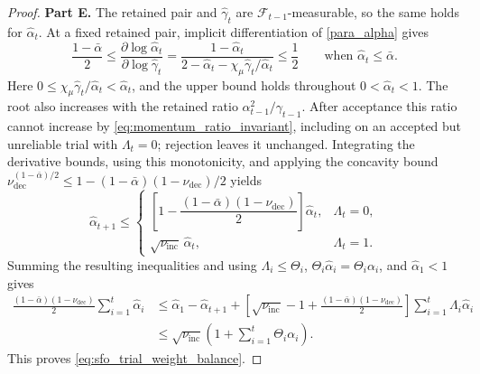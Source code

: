 \documentclass{article}
\begin{document}
\begin{proof}
\medskip
\noindent\textbf{Part E.}
The retained pair and \(\hat\gamma_t\) are
\(\mathcal F_{t-1}\)-measurable, so the same holds for \(\hat\alpha_t\).
At a fixed retained pair, implicit differentiation of
\eqref{para_alpha} gives
\[
\frac{1-\bar\alpha}{2}
\le
\frac{\partial\log\hat\alpha_t}{\partial\log\hat\gamma_t}
=\frac{1-\hat\alpha_t}
{2-\hat\alpha_t-\chi_\mu\hat\gamma_t/\hat\alpha_t}
\le
\frac12
\qquad\text{when }\hat\alpha_t\le\bar\alpha.
\]
Here \(0\le\chi_\mu\hat\gamma_t/\hat\alpha_t<\hat\alpha_t\),
and the upper bound holds throughout \(0<\hat\alpha_t<1\).
The root also increases with the retained ratio
\(\alpha_{t-1}^2/\gamma_{t-1}\). After acceptance this ratio cannot
increase by \eqref{eq:momentum_ratio_invariant}, including on an
accepted but unreliable trial with \(\Lambda_t=0\); rejection leaves
it unchanged. Integrating the derivative bounds, using this
monotonicity, and applying the concavity bound
\(\nu_{\mathrm{dec}}^{(1-\bar\alpha)/2}
\le1-(1-\bar\alpha)(1-\nu_{\mathrm{dec}})/2\) yields
\begin{equation}\label{eq:sfo_trial_weight_dynamics}
\hat\alpha_{t+1}\le
\begin{cases}
\left[1-\dfrac{(1-\bar\alpha)(1-\nu_{\mathrm{dec}})}{2}\right]
\hat\alpha_t,&\Lambda_t=0,\\
\sqrt{\nu_{\mathrm{inc}}}\,\hat\alpha_t,&\Lambda_t=1.
\end{cases}
\end{equation}
Summing the resulting inequalities and using
\(\Lambda_i\le\Theta_i\), \(\Theta_i\hat\alpha_i=\Theta_i\alpha_i\),
and \(\hat\alpha_1<1\) gives
\[
\begin{aligned}
\frac{(1-\bar\alpha)(1-\nu_{\mathrm{dec}})}{2}
\sum_{i=1}^t\hat\alpha_i
&\le\hat\alpha_1-\hat\alpha_{t+1}+\left[\sqrt{\nu_{\mathrm{inc}}}-1+
\frac{(1-\bar\alpha)(1-\nu_{\mathrm{dec}})}{2}\right]
\sum_{i=1}^t\Lambda_i\hat\alpha_i\\
&\le\sqrt{\nu_{\mathrm{inc}}}
\left(1+\sum_{i=1}^t\Theta_i\alpha_i\right).
\end{aligned}
\]
This proves \eqref{eq:sfo_trial_weight_balance}.
\end{proof}
\newpage
\end{document}
